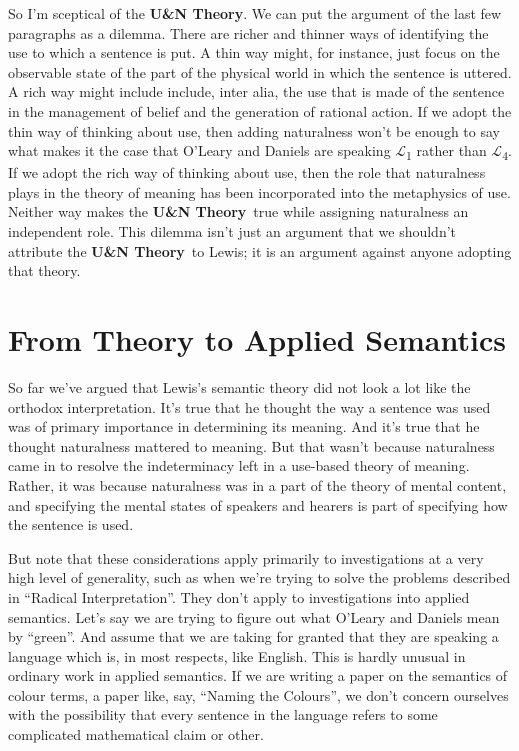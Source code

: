 \documentclass[
  10pt,
  letterpaper,
  DIV=11,
  numbers=noendperiod,
  twoside]{scrartcl}
\begin{document}
So I'm sceptical of the \textbf{U\&N Theory}. We can put the argument of
the last few paragraphs as a dilemma. There are richer and thinner ways
of identifying the use to which a sentence is put. A thin way might, for
instance, just focus on the observable state of the part of the physical
world in which the sentence is uttered. A rich way might include
include, inter alia, the use that is made of the sentence in the
management of belief and the generation of rational action. If we adopt
the thin way of thinking about use, then adding naturalness won't be
enough to say what makes it the case that O'Leary and Daniels are
speaking \(\mathcal{L}\)\textsubscript{1} rather than
\(\mathcal{L}\)\textsubscript{4}. If we adopt the rich way of thinking
about use, then the role that naturalness plays in the theory of meaning
has been incorporated into the metaphysics of use. Neither way makes the
\textbf{U\&N Theory}~true while assigning naturalness an independent
role. This dilemma isn't just an argument that we shouldn't attribute
the \textbf{U\&N Theory}~to Lewis; it is an argument against anyone
adopting that theory.

\section{From Theory to Applied
Semantics}\label{from-theory-to-applied-semantics}

So far we've argued that Lewis's semantic theory did not look a lot like
the orthodox interpretation. It's true that he thought the way a
sentence was used was of primary importance in determining its meaning.
And it's true that he thought naturalness mattered to meaning. But that
wasn't because naturalness came in to resolve the indeterminacy left in
a use-based theory of meaning. Rather, it was because naturalness was in
a part of the theory of mental content, and specifying the mental states
of speakers and hearers is part of specifying how the sentence is used.

But note that these considerations apply primarily to investigations at
a very high level of generality, such as when we're trying to solve the
problems described in ``Radical Interpretation''. They don't apply to
investigations into applied semantics. Let's say we are trying to figure
out what O'Leary and Daniels mean by ``green''. And assume that we are
taking for granted that they are speaking a language which is, in most
respects, like English. This is hardly unusual in ordinary work in
applied semantics. If we are writing a paper on the semantics of colour
terms, a paper like, say, ``Naming the Colours'', we don't concern
ourselves with the possibility that every sentence in the language
refers to some complicated mathematical claim or other.
\end{document}
